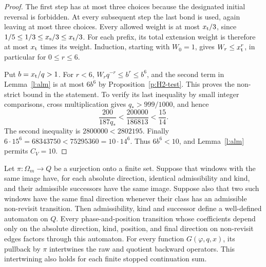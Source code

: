 \begin{proof}
The first step has at most three choices because the designated
initial reversal is forbidden. At every subsequent step the last
bond is used, again leaving at most three choices. Every allowed
weight is at most \(x_{\rm t}/3\), since
\(1/5\le1/3\le x_{\rm s}/3\le x_{\rm t}/3\).
For each prefix, its total extension weight is therefore at most
\(x_{\rm t}\) times its weight. Induction, starting with \(W_0=1\),
gives \(W_r\le x_{\rm t}^r\), in particular for \(0\le r\le6\).

Put \(b=x_{\rm t}/q>1\). For \(r<6\),
\(W_rq^{-r}\le b^r\le b^6\), and the second term in
Lemma~\ref{l:alm} is at most \(6b^6\) by
Proposition~\ref{p:H2-test}. This proves the non-strict bound
in the statement. To verify its last inequality by small integer
comparisons, cross multiplication gives
\(q_*>999/1000\), and hence
\[
 \frac{200}{187q_*}<\frac{200000}{186813}<\frac{15}{14}.
\]
The second inequality is \(2800000<2802195\).
Finally
\(6\cdot15^6=68343750<75295360=10\cdot14^6\).
Thus \(6b^6<10\), and Lemma~\ref{l:alm} permits \(C_V=10\).
\end{proof}

\begin{lemma}\label{l:automaton-quotient}
Let \(\pi:\Omega_m\to Q\) be a surjection onto a finite set.
Suppose that windows with the same image have, for each absolute
direction, identical admissibility and kind, and their admissible
successors have the same image. Suppose also that two such windows
have the same final direction whenever their class has an admissible
non-revisit transition.
Then admissibility, kind and successor define a well-defined automaton
on \(Q\). Every phase-and-position transition whose coefficients
depend only on the absolute direction, kind, position, and final
direction on non-revisit edges factors through this automaton.
For every function \(G(\varphi,q,x)\), its pullback by \(\pi\)
intertwines the raw and quotient backward operators. This
intertwining also holds for each finite stopped continuation sum.
\end{lemma}


